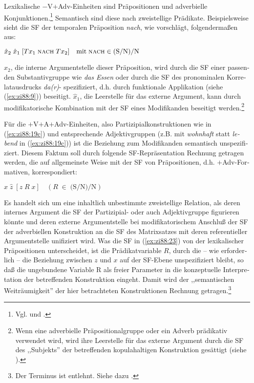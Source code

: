 \documentclass[output=paper,colorlinks,citecolor=brown, booklanguage=german]{langscibook}
\begin{document}
\begin{otherlanguage}{german}
Lexikalische $-$V$+$Adv-Einheiten sind Präpositionen und adverbielle Konjunktionen.\footnote{Vgl. \citet{Steinitz.Lang1969} und \citet{Jackendoff1974,Jackendoff1977}.} Semantisch sind diese nach \citet{Bierwisch-Drucka} zweistellige Prädikate. Beispielsweise sieht die SF der temporalen Präposition \textit{nach}, wie \citet{Steube1987-druck,Steube1987} vorschlägt, folgendermaßen aus:

\ea\label{ex:zi88:22} $\hat{x}_2 \; \hat{x}_1 \; [Tx_1 \; \textsc{nach} \; Tx_2] \quad \textrm{mit}\;  \textsc{nach} \in \textrm{(S/N)/N}$
\z 

\noindent $\hat{x}_2$, die interne Argumentstelle dieser Präposition, wird durch die SF einer passenden Substantivgruppe wie \textit{das Essen} oder durch die SF des pronominalen Korrelatausdrucks \textit{da(r)}- spezifiziert, d.h. durch funktionale Applikation (siehe (\ref{ex:zi88:9})) beseitigt. $\hat{x}_1$, die Leerstelle für das externe Argument, kann durch modifikatorische Kombination mit der SF eines Modifikanden beseitigt werden.\footnote{Wenn eine adverbielle Präpositionalgruppe oder ein Adverb prädikativ verwendet wird, wird ihre Leerstelle für das externe Argument durch die SF des ,,Subjekts'' der betreffenden kopulahaltigen Konstruktion gesättigt (siehe \citealt{Bierwisch-Drucka}).}

Für die $+$V$+$A$+$Adv-Einheiten, also Partizipialkonstruktionen wie in (\ref{ex:zi88:19c}) und entsprechende Adjektivgruppen (z.B. mit \textit{wohnhaft} statt \textit{lebend} in (\ref{ex:zi88:19c})) ist die Beziehung zum Modifikanden semantisch unspezifiziert. Diesem Faktum soll durch folgende SF-Repräsentation Rechnung getragen werden, die auf allgemeinste Weise mit der SF von Präpositionen, d.h. $+$Adv-Formativen, korrespondiert:

\ea\label{ex:zi88:23} $\hat{x} \; \hat{z} \; [z \; R \; x] \quad (R \; \in \; \textrm{(S/N)/N})$
\z 

\noindent Es handelt sich um eine inhaltlich unbestimmte zweistellige Relation, als deren internes Argument die SF der Partizipial- oder auch Adjektivgruppe figurieren könnte und deren externe Argumentstelle bei modifikatorischem Anschluß der SF der adverbiellen Konstruktion an die SF des Matrixsatzes mit deren referentieller Argumentstelle unifiziert wird. Was die SF in (\ref{ex:zi88:23}) von der lexikalischer Präpositionen unterscheidet, ist die Prädikatvariable $R$, durch die -- wie erforderlich -- die Beziehung zwischen $z$ und $x$ auf der SF-Ebene unspezifiziert bleibt, so daß die ungebundene Variable R als freier Parameter in die konzeptuelle Interpretation der betreffenden Konstruktion eingeht. Damit wird der ,,semantischen Weiträumigkeit'' der hier betrachteten Konstruktionen Rechnung getragen.\footnote{Der Terminus ist \citet[90]{Ruzicka1980} entlehnt. Siehe dazu \citet{Zimmermann1981}.}


\end{otherlanguage}
\end{document}

